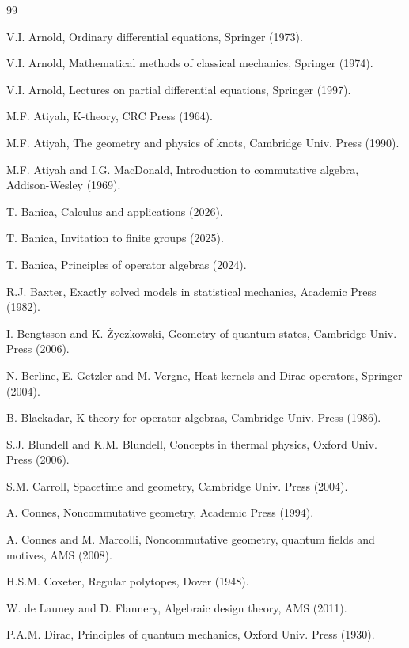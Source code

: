 \documentclass[12pt]{amsbook}
\begin{document}
\begin{thebibliography}{99}

\baselineskip=17.6pt

V.I. Arnold, Ordinary differential equations, Springer (1973).

V.I. Arnold, Mathematical methods of classical mechanics, Springer (1974).

V.I. Arnold, Lectures on partial differential equations, Springer (1997).

M.F. Atiyah, K-theory, CRC Press (1964).

M.F. Atiyah, The geometry and physics of knots, Cambridge Univ. Press (1990).

M.F. Atiyah and I.G. MacDonald, Introduction to commutative algebra, Addison-Wesley (1969).

T. Banica, Calculus and applications (2026).

T. Banica, Invitation to finite groups (2025).

T. Banica, Principles of operator algebras (2024).

R.J. Baxter, Exactly solved models in statistical mechanics, Academic Press (1982).

I. Bengtsson and K. \.Zyczkowski, Geometry of quantum states, Cambridge Univ. Press (2006).

N. Berline, E. Getzler and M. Vergne, Heat kernels and Dirac operators, Springer (2004).

B. Blackadar, K-theory for operator algebras, Cambridge Univ. Press (1986).

S.J. Blundell and K.M. Blundell, Concepts in thermal physics, Oxford Univ. Press (2006).

S.M. Carroll, Spacetime and geometry, Cambridge Univ. Press (2004).

A. Connes, Noncommutative geometry, Academic Press (1994).

A. Connes and M. Marcolli, Noncommutative geometry, quantum fields and motives, AMS (2008).

H.S.M. Coxeter, Regular polytopes, Dover (1948).

W. de Launey and D. Flannery, Algebraic design theory, AMS (2011).

P.A.M. Dirac, Principles of quantum mechanics, Oxford Univ. Press (1930).


\end{thebibliography}
\end{document}
